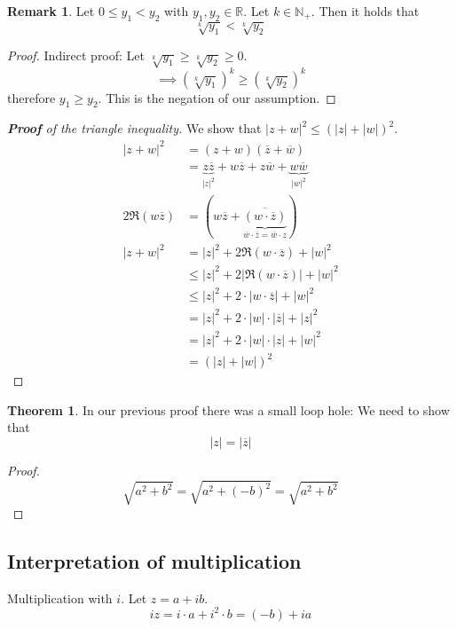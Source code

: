 \documentclass[a4paper,landscape,twocolumn]{article}
\theoremstyle{definition}
\newtheorem{theorem}{Theorem}
\newtheorem{rem}{Remark}
\newcommand\abs[1]{\left|#1\right|}
\begin{document}
\begin{rem}
  Let $0 \leq y_1 < y_2$ with $y_1, y_2 \in \mathbb R$.
  Let $k \in \mathbb N_+$. Then it holds that
  \[ \sqrt[k]{y_1} < \sqrt[k]{y_2} \]
\end{rem}

\begin{proof}
  Indirect proof: Let $\sqrt[k]{y_1} \geq \sqrt[k]{y_2} \geq 0$.
  \[ \implies \left(\sqrt[k]{y_1}\right)^k \geq \left(\sqrt[k]{y_2}\right)^k \]
  therefore $y_1 \geq y_2$. This is the negation of our assumption.
\end{proof}

\begin{proof}[\textbf{Proof} of the triangle inequality]
  We show that $\abs{z + w}^2 \leq \left(\abs{z} + \abs{w}\right)^2$.
  \begin{align*}
    \abs{z + w}^2
      &= (z + w)(\overline z + \overline w) \\
      &= \underbrace{z \overline z}_{\abs{z}^2} + w \overline z + z \overline w + \underbrace{w \overline w}_{\abs{w}^2} \\
  2 \Re{(w \overline{z})} &= (w \overline{z} + \underbrace{\overline{(w \cdot \overline z)}}_{\overline w \cdot \overline z = \overline w \cdot z}) \\
    \abs{z + w}^2
      &= \abs{z}^2 + 2\Re{(w \cdot \overline z)} + \abs{w}^2 \\
      &\leq \abs{z}^2 + 2\abs{\Re{(w \cdot \overline z)}} + \abs{w}^2 \\
      &\leq \abs{z}^2 + 2 \cdot \abs{w \cdot \overline{z}} + \abs{w}^2 \\
      &= \abs{z}^2 + 2 \cdot \abs{w} \cdot \abs{\overline{z}} + \abs{z}^2 \\
      &= \abs{z}^2 + 2 \cdot \abs{w} \cdot \abs{z} + \abs{w}^2 \\
      &= \left(\abs{z} + \abs{w}\right)^2
  \end{align*}
\end{proof}

\begin{theorem}
  In our previous proof there was a small loop hole: We need to show that
  \[ \abs{z} = \abs{\overline z} \]
\end{theorem}

\begin{proof}
  \[ \sqrt{a^2 + b^2} = \sqrt{a^2 + (-b)^2} = \sqrt{a^2 + b^2} \]
\end{proof}

\subsection{Interpretation of multiplication}
%
Multiplication with $i$. Let $z = a + ib$.
\[ iz = i\cdot a + i^2 \cdot b = (-b) + i a \]
\end{document}
